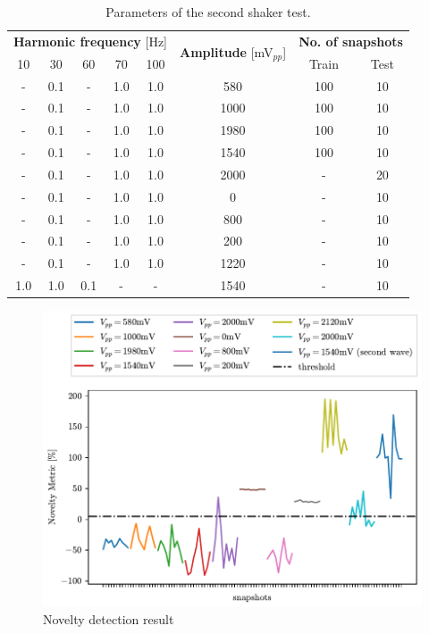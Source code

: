 \begin{table}
    \centering
    \caption{Parameters of the second shaker test.}
    \label{tab:shaker_param_02}
    \begin{tabular}{cccccccc} 
    \toprule
    \multicolumn{5}{c}{\textbf{Harmonic frequency} {[}Hz]} & \multirow{2}{*}{\textbf{Amplitude }{[}mV$_{pp}$]} & \multicolumn{2}{c}{\textbf{ No. of snapshots}} \\
    10 & 30 & 60 & 70 & 100 &  & Train & Test \\ 
    \hline
    - & 0.1 & - & 1.0 & 1.0 & 580 & 100 & 10 \\
    - & 0.1 & - & 1.0 & 1.0 & 1000 & 100 & 10 \\
    - & 0.1 & - & 1.0 & 1.0 & 1980 & 100 & 10 \\
    - & 0.1 & - & 1.0 & 1.0 & 1540 & 100 & 10 \\
    - & 0.1 & - & 1.0 & 1.0 & 2000 & - & 20 \\
    - & 0.1 & - & 1.0 & 1.0 & 0 & - & 10 \\
    - & 0.1 & - & 1.0 & 1.0 & 800 & - & 10 \\
    - & 0.1 & - & 1.0 & 1.0 & 200 & - & 10 \\
    - & 0.1 & - & 1.0 & 1.0 & 1220 & - & 10 \\
    1.0 & 1.0 & 0.1 & - & - & 1540 & - & 10 \\
    \bottomrule
    \end{tabular}
    \end{table}

\begin{figure}
    \centering
    \includegraphics{Images/shaker/Test02.pdf}
    \caption{Novelty detection result}
    \label{fig:shaker_results02}
\end{figure}

